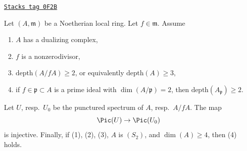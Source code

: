 \begin{proposition}[Koll\'ar]

\label{algebraization-proposition-injective-pic}
\href{https://stacks.math.columbia.edu/tag/0F2B}{\texttt{Stacks tag 0F2B}}

\begin{reference}
\cite[Theorem 1.9]{Kollar-map-pic}
\end{reference}
Let $(A, \mathfrak m)$ be a Noetherian local ring. Let $f \in \mathfrak m$.
Assume
\begin{enumerate}
\item $A$ has a dualizing complex,
\item $f$ is a nonzerodivisor,
\item $\text{depth}(A/fA) \geq 2$, or equivalently $\text{depth}(A) \geq 3$,
\item if $f \in \mathfrak p \subset A$ is a prime ideal with
$\dim(A/\mathfrak p) = 2$, then $\text{depth}(A_\mathfrak p) \geq 2$.
\end{enumerate}
Let $U$, resp.\ $U_0$ be the punctured spectrum of $A$, resp.\ $A/fA$. The map
$$
\Pic(U) \to \Pic(U_0)
$$
is injective. Finally, if (1), (2), (3), $A$ is $(S_2)$, and
$\dim(A) \geq 4$, then (4) holds.
\end{proposition}

